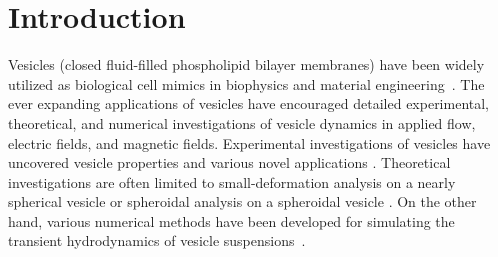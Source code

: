 \documentclass[prf,superscriptaddress,showkeys,longbibliography]{revtex4-1}
\begin{document}
\maketitle



\section{Introduction}
Vesicles (closed fluid-filled phospholipid bilayer membranes) have been
widely utilized as biological cell mimics in biophysics and material
engineering~\cite{sackmann1996, FenzSengupta2012_IntegrBiol,Barthes-Biesel2016_ARFM}.  The ever
expanding applications of vesicles have encouraged detailed experimental,
theoretical, and numerical investigations of vesicle dynamics in
applied flow, electric fields, and magnetic fields.  
Experimental investigations of vesicles have uncovered vesicle properties and various novel applications
\cite{Dobereiner2000_CurrentOpinionCIS,EvansRawiczSmith2013_FaradayDiscussions,SugiyamaToyota2018_Life}. 
Theoretical investigations are often limited to small-deformation analysis on a nearly spherical vesicle
or spheroidal analysis on a spheroidal vesicle \cite{Barthes-BieselRallison1981_JFM, Misbah2006_PRL,
Vlahovska2007_PRE, Finken2008_EPL, ZhangZahnTanLin2013_PoF,
Nganguia2013_PRE}.  On the other hand, various numerical methods have
been developed for simulating the transient hydrodynamics of vesicle
suspensions~\cite{BagchiJohoson2005_JBE, Biben2005_EJP,
Veerapaneni2009_JCP, SeolHuKimLai2016_JCP}.  
\end{document}
